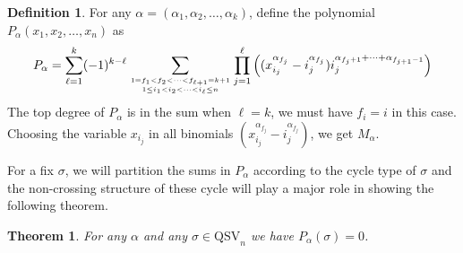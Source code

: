 \documentclass[12pt]{amsart}
\newtheorem{thm}[equation]{Theorem}
\theoremstyle{definition}
\newtheorem{definition}[equation]{Definition}
\theoremstyle{remark}
\numberwithin{equation}{section}
\newcommand{\QSV}{\mathrm{QSV}}
\begin{document}
\begin{definition}\label{def:vanishP}
 For any $\alpha=(\alpha_1,\alpha_2,\ldots,\alpha_k)$, define the polynomial $P_\alpha(x_1,x_2,\ldots,x_n)$ as
	$$P_\alpha=\sum_{\ell=1}^k (-1)^{k-\ell} \sum_{1=f_1<f_2<\cdots <f_{\ell+1}=k+1  \atop 1\le i_1<i_2<\cdots < i_\ell\le n} \prod_{j=1}^\ell 
	      \Big( (x_{i_j}^{\alpha_{f_j}}- i_j^{\alpha_{f_j }})  i_j^{\alpha_{f_j +1}+\cdots+\alpha_{f_{j +1}-1}} \Big)
	      $$
	      The top degree of $P_\alpha$ is in the sum when $\ell=k$, we must have $f_i=i$ in this case. Choosing the variable $x_{i_j}$ in all binomials $(x_{i_j}^{\alpha_{f_j}}- i_j^{\alpha_{f_j }})$, we get $M_\alpha$.
\end{definition}
	      
For a fix $\sigma$, we will partition the sums in $P_\alpha$ according to the cycle type of $\sigma$ and the non-crossing structure
of these cycle will play a major role in showing the following theorem.

\begin{thm}\label{thm:vanishing}
 For any $\alpha$ and any $\sigma\in \QSV_n$ we  have $P_\alpha(\sigma)=0$.
\end{thm}
\end{document}
